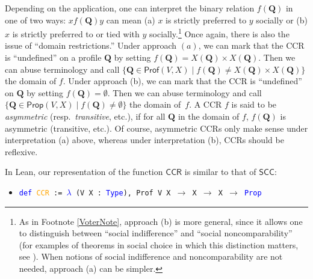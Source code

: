 \documentclass[runningheads]{llncs}
\begin{document}
\noindent Depending on the application, one can interpret the binary relation $f(\mathbf{Q})$ in one of two ways: $xf(\mathbf{Q})y$ can mean (a) $x$ is strictly preferred to $y$ socially or (b) $x$ is strictly preferred to or tied with $y$ socially.\footnote{As in Footnote \ref{VoterNote}, approach (b) is more general, since it allows one to distinguish between ``social indifference'' and ``social noncomparability'' (for examples of theorems in social choice in which this distinction matters, see \cite{HK2020}). When notions of social indifference and noncomparability are not needed, approach (a) can be simpler.} Once again, there is also the issue of ``domain restrictions.'' Under approach $(a)$, we can mark that the CCR is ``undefined'' on a profile $\mathbf{Q}$ by setting $f(\mathbf{Q})= X(\mathbf{Q})\times X(\mathbf{Q})$. Then we can abuse terminology and call $\{\mathbf{Q}\in\mathsf{Prof}(V,X)\mid f(\mathbf{Q})\neq X(\mathbf{Q})\times X(\mathbf{Q}) \}$ the domain of $f$. Under approach (b), we can mark that the CCR is ``undefined'' on $\mathbf{Q}$ by setting $f(\mathbf{Q})=\emptyset$. Then we can abuse terminology and call $\{\mathbf{Q}\in\mathsf{Prop}(V,X)\mid f(\mathbf{Q})\neq \emptyset\}$ the domain of~$f$.  A CCR $f$ is said to be \textit{asymmetric} (resp.~\textit{transitive}, etc.), if for all $\mathbf{Q}$ in the domain of $f$, $f(\mathbf{Q})$ is asymmetric (transitive, etc.). Of course, asymmetric CCRs only make sense under interpretation (a) above, whereas under interpretation (b), CCRs should be reflexive.

In Lean, our representation of the function $\mathsf{CCR}$ is similar to that of $\mathsf{SCC}$:
\begin{itemize}
\item[] \texttt{\textcolor{blue}{def} \textcolor{orange}{CCR} := \textcolor{blue}{$\lambda$} (V X : \textcolor{blue}{Type}), Prof V X $\to$ X $\to$ X $\to$ \textcolor{blue}{Prop}}
\end{itemize}
\end{document}
